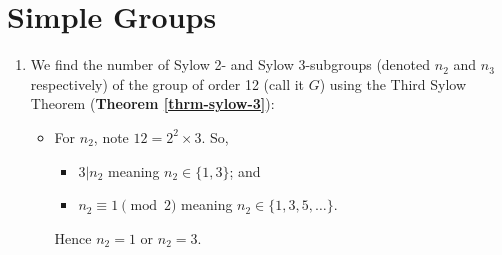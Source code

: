 \section{Simple Groups}
\begin{enumerate}
    

    \item We find the number of Sylow 2- and Sylow 3-subgroups (denoted $n_2$ and $n_3$ respectively) of the group of order 12 (call it $G$) using the Third Sylow Theorem (\textbf{Theorem \ref{thrm-sylow-3}}):
    \begin{itemize}
        \item For $n_2$, note $12 = 2^2 \times 3$. So,
        \begin{itemize}
            \item $3 \vert n_2$ meaning $n_2 \in \{1, 3\}$; and
            \item $n_2 \equiv 1 \pmod 2$ meaning $n_2 \in \{1, 3, 5, \dots\}$.
        \end{itemize}
        Hence $n_2 = 1$ or $n_2 = 3$.


\end{itemize}
\end{enumerate}
